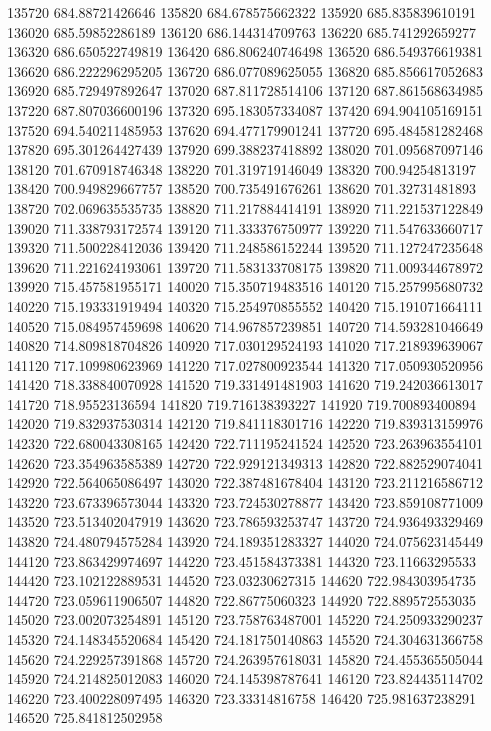 {135720 684.88721426646
135820 684.678575662322
135920 685.835839610191
136020 685.59852286189
136120 686.144314709763
136220 685.741292659277
136320 686.650522749819
136420 686.806240746498
136520 686.549376619381
136620 686.222296295205
136720 686.077089625055
136820 685.856617052683
136920 685.729497892647
137020 687.811728514106
137120 687.861568634985
137220 687.807036600196
137320 695.183057334087
137420 694.904105169151
137520 694.540211485953
137620 694.477179901241
137720 695.484581282468
137820 695.301264427439
137920 699.388237418892
138020 701.095687097146
138120 701.670918746348
138220 701.319719146049
138320 700.94254813197
138420 700.949829667757
138520 700.735491676261
138620 701.32731481893
138720 702.069635535735
138820 711.217884414191
138920 711.221537122849
139020 711.338793172574
139120 711.333376750977
139220 711.547633660717
139320 711.500228412036
139420 711.248586152244
139520 711.127247235648
139620 711.221624193061
139720 711.583133708175
139820 711.009344678972
139920 715.457581955171
140020 715.350719483516
140120 715.257995680732
140220 715.193331919494
140320 715.254970855552
140420 715.191071664111
140520 715.084957459698
140620 714.967857239851
140720 714.593281046649
140820 714.809818704826
140920 717.030129524193
141020 717.218939639067
141120 717.109980623969
141220 717.027800923544
141320 717.050930520956
141420 718.338840070928
141520 719.331491481903
141620 719.242036613017
141720 718.95523136594
141820 719.716138393227
141920 719.700893400894
142020 719.832937530314
142120 719.841118301716
142220 719.839313159976
142320 722.680043308165
142420 722.711195241524
142520 723.263963554101
142620 723.354963585389
142720 722.929121349313
142820 722.882529074041
142920 722.564065086497
143020 722.387481678404
143120 723.211216586712
143220 723.673396573044
143320 723.724530278877
143420 723.859108771009
143520 723.513402047919
143620 723.786593253747
143720 724.936493329469
143820 724.480794575284
143920 724.189351283327
144020 724.075623145449
144120 723.863429974697
144220 723.451584373381
144320 723.11663295533
144420 723.102122889531
144520 723.03230627315
144620 722.984303954735
144720 723.059611906507
144820 722.86775060323
144920 722.889572553035
145020 723.002073254891
145120 723.758763487001
145220 724.250933290237
145320 724.148345520684
145420 724.181750140863
145520 724.304631366758
145620 724.229257391868
145720 724.263957618031
145820 724.455365505044
145920 724.214825012083
146020 724.145398787641
146120 723.824435114702
146220 723.400228097495
146320 723.33314816758
146420 725.981637238291
146520 725.841812502958
}
